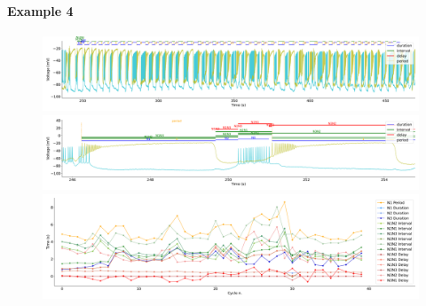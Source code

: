 \paragraph{\large{Example 4}}

\begin{figure}[htbp]
	\centering
	\begin{minipage}[b]{\textwidth}
		\centering				\includegraphics[width=\textwidth,height=0.1\textheight]{./invariants/data/SUSSEX/CV1a_driven4/images/stim_cv1a4_3phases_signal_intervals_zoom.pdf}
		\includegraphics[width=\textwidth]{./invariants/data/SUSSEX/CV1a_driven4/images/stim_cv1a4_3phases_signal_intervals_cycle.pdf}
		\includegraphics[width=\textwidth]{./invariants/data/SUSSEX/CV1a_driven4/images/stim_cv1a4_3phases_time_cycle.pdf}
	\end{minipage}
	\centering
	\begin{minipage}{0.9\textwidth}
		\begin{minipage}[b]{0.45\textwidth}
			\centering

\end{minipage}
\end{minipage}
\end{figure}
